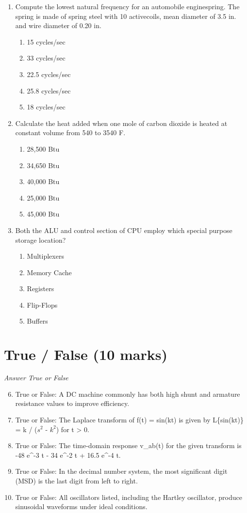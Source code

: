 \documentclass[12pt]{article}
\begin{document}
\begin{enumerate}[label=\arabic*.]
\begin{enumerate}[label=(\alph*)]
\end{enumerate}
\item Compute the lowest natural frequency for an automobile enginespring. The spring is made of spring steel with 10 activecoils, mean diameter of 3.5 in. and wire diameter of 0.20 in.
\begin{enumerate}[label=(\alph*)]
    \item 15 cycles/sec
    \item 33 cycles/sec
    \item 22.5 cycles/sec
    \item 25.8 cycles/sec
    \item 18 cycles/sec
\end{enumerate}
\item Calculate the heat added when one mole of carbon dioxide is heated at constant volume from 540 to 3540 F.
\begin{enumerate}[label=(\alph*)]
    \item 28,500 Btu
    \item 34,650 Btu
    \item 40,000 Btu
    \item 25,000 Btu
    \item 45,000 Btu
\end{enumerate}
\item Both the ALU and control section of CPU employ which special purpose storage location?
\begin{enumerate}[label=(\alph*)]
    \item Multiplexers
    \item Memory Cache
    \item Registers
    \item Flip-Flops
    \item Buffers
\end{enumerate}
\end{enumerate}

\section*{True / False (10 marks)}
\textit{Answer True or False}
\begin{enumerate}[label=\arabic*.]
\setcounter{enumi}{5}
\item True or False: A DC machine commonly has both high shunt and armature resistance values to improve efficiency.
\item True or False: The Laplace transform of f(t) = sin(kt) is given by L\{sin(kt)\} = k / ($s^2$ - $k^2$) for t \textgreater{} 0.
\item True or False: The time-domain response v\_ab(t) for the given transform is -48 e^-3 t - 34 e^-2 t + 16.5 e^-4 t.
\item True or False: In the decimal number system, the most significant digit (MSD) is the last digit from left to right.
\item True or False: All oscillators listed, including the Hartley oscillator, produce sinusoidal waveforms under ideal conditions.
\end{enumerate}
\end{document}

